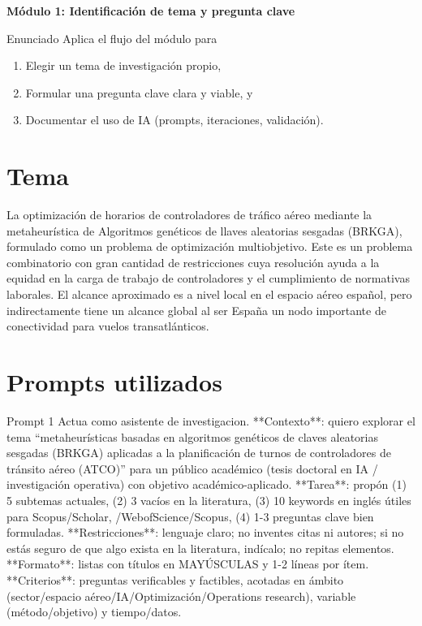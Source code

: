 \begin{center}
  \Large
  \color{colorA}
  \textbf{Módulo 1:  Identificación de tema y pregunta clave}
\end{center}

\begin{boxA}{Enunciado}
  Aplica el flujo del módulo para
  \begin{enumerate}
    \item Elegir un tema de investigación propio,
    \item Formular una pregunta
      clave clara y viable, y
    \item Documentar el uso de IA (prompts, iteraciones, validación).
  \end{enumerate}
\end{boxA}

\section{Tema}
La optimización de horarios de controladores de tráfico aéreo mediante la metaheurística de Algoritmos genéticos de llaves aleatorias sesgadas (BRKGA), formulado como un problema de optimización multiobjetivo. Este es un problema combinatorio con gran cantidad de restricciones cuya resolución ayuda a la equidad en la carga de trabajo de controladores y el cumplimiento de normativas laborales. El alcance aproximado es a nivel local en el espacio aéreo español, pero indirectamente tiene un alcance global al ser España un nodo importante de conectividad para vuelos transatlánticos.
\section{Prompts utilizados}

\begin{promptbox}{Prompt 1}
  Actua como asistente de investigacion.
  **Contexto**: quiero explorar el tema “metaheurísticas basadas en algoritmos genéticos de claves aleatorias sesgadas (BRKGA) aplicadas a la planificación de turnos de controladores de tránsito aéreo (ATCO)” para un público académico (tesis doctoral en IA / investigación operativa) con objetivo académico-aplicado.
  **Tarea**: propón (1) 5 subtemas actuales, (2) 3 vacíos en la literatura, (3) 10 keywords en inglés útiles para Scopus/Scholar, /WebofScience/Scopus, (4) 1-3 preguntas clave bien formuladas.
  **Restricciones**: lenguaje claro; no inventes citas ni autores; si no estás seguro de que algo exista en la literatura, indícalo; no repitas elementos.
  **Formato**: listas con títulos en MAYÚSCULAS y 1-2 líneas por ítem.
  **Criterios**: preguntas verificables y factibles, acotadas en ámbito (sector/espacio aéreo/IA/Optimización/Operations research), variable (método/objetivo) y tiempo/datos.
  \label{prompt1}
\end{promptbox}

